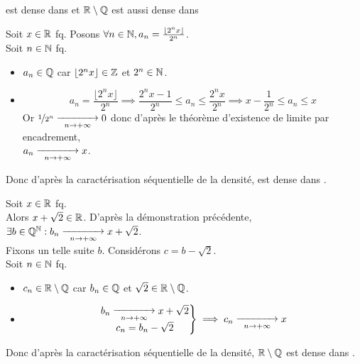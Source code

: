 \documentclass{article}
\begin{document}
	\begin{question_kholle}
		{\Q est dense dans \R et $\mathbb R \setminus \mathbb Q$ est aussi dense dans \R}

		Soit $x \in \mathbb R$ fq.
		Posons $\forall n \in \mathbb N, a_n = \frac{\lfloor2^n x\rfloor}{2^n}$. \\
		Soit $n \in \mathbb N$ fq. \\
		\begin{itemize}
			\item $a_n \in \mathbb Q$ car $\lfloor2^n x\rfloor \in \mathbb Z$ et $2^n \in \mathbb N$.
			\item \begin{equation*}
					a_n = \frac{\lfloor2^n x\rfloor}{2^n}
					\implies \frac{2^n x - 1}{2^n} \leqslant a_n \leqslant \frac{2^n x}{2^n}
					\implies x - \frac{1}{2^n} \leqslant a_n \leqslant x
				\end{equation*}
				Or $\nicefrac{1}{2^n} \;\underset{n \rightarrow + \infty}{\parbox{1.5cm}{\rightarrowfill}}\; 0$ donc d'après le théorème d'existence de limite par encadrement, \\ $a_n \;\underset{n \rightarrow + \infty}{\parbox{1.5cm}{\rightarrowfill}}\; x$.
		\end{itemize}
		Donc d'après la caractérisation séquentielle de la densité, \Q est dense dans \R.
		\bigbreak

		\noindent Soit $x \in \mathbb R$ fq. \\
		Alors $x + \sqrt{2} \in \mathbb R$.
		D'après la démonstration précédente, $\exists b \in \Q^\N : b_n \;\underset{n \rightarrow + \infty}{\parbox{1.5cm}{\rightarrowfill}}\; x + \sqrt{2}$. \\
		Fixons un telle suite $b$.
		Considérons $c = b - \sqrt{2}$. \\
		Soit $n \in \mathbb N$ fq.
		\begin{itemize}
			\item $c_n \in \mathbb R\setminus\mathbb Q$ car $b_n \in \mathbb Q$ et $\sqrt{2} \in \mathbb R \setminus \mathbb Q$.
			\item \begin{equation*}
				\left. \begin{matrix}
					b_n \;\underset{n \rightarrow + \infty}{\parbox{1.5cm}{\rightarrowfill}}\; x + \sqrt{2} \\
					c_n = b_n - \sqrt{2}
				\end{matrix} \right\}
				\implies c_n \;\underset{n \rightarrow + \infty}{\parbox{1.5cm}{\rightarrowfill}}\; x
			\end{equation*}
		\end{itemize}
		Donc d'après la caractérisation séquentielle de la densité, $\mathbb R\setminus \mathbb Q$ est dense dans \R.
	\end{question_kholle}
\end{document}
